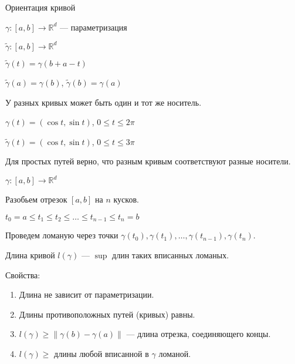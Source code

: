     \begin{Def}
    
        Ориентация кривой

        $\gamma \colon [a, b] \rightarrow \mathbb{R}^d$ --- параметризация

        $\widetilde{\gamma} \colon [a, b] \rightarrow \mathbb{R}^d$

        $\widetilde{\gamma}(t) = \gamma(b + a - t)$

        $\widetilde{\gamma}(a) = \gamma(b)$, $\widetilde{\gamma}(b) = \gamma(a)$
    
    \end{Def}

    \begin{Rem}
   
        У разных кривых может быть один и тот же носитель.
    
        $\gamma(t) = (\cos t, \sin t)$, $0 \le t \le 2\pi$

        $\widetilde{\gamma}(t) = (\cos t, \sin t)$, $0 \le t \le 3\pi$

        Для простых путей верно, что разным кривым соответствуют разные носители.
    
    \end{Rem}

    \begin{Def}
    
        $\gamma \colon [a, b] \rightarrow \mathbb{R}^d$

        Разобьем отрезок $[a, b]$ на $n$ кусков.

        $t_0 = a \le t_1 \le t_2 \le \dots \le t_{n-1} \le t_n = b$

        Проведем ломаную через точки $\gamma(t_0), \gamma(t_1), \dots, \gamma(t_{n-1}), \gamma(t_n)$.
        
        Длина кривой $l(\gamma)$ --- $\sup$ длин таких вписанных ломаных.
    
    \end{Def}

    Свойства:
    
    \begin{enumerate}
    
        \item Длина не зависит от параметризации.

        \item Длины противоположных путей (кривых) равны.

        \item $l(\gamma) \ge \|\gamma(b) - \gamma(a)\|$ --- длина отрезка, соединяющего концы.

        \item $l(\gamma) \ge$ длины любой вписанной в $\gamma$ ломаной.
    
    \end{enumerate}

